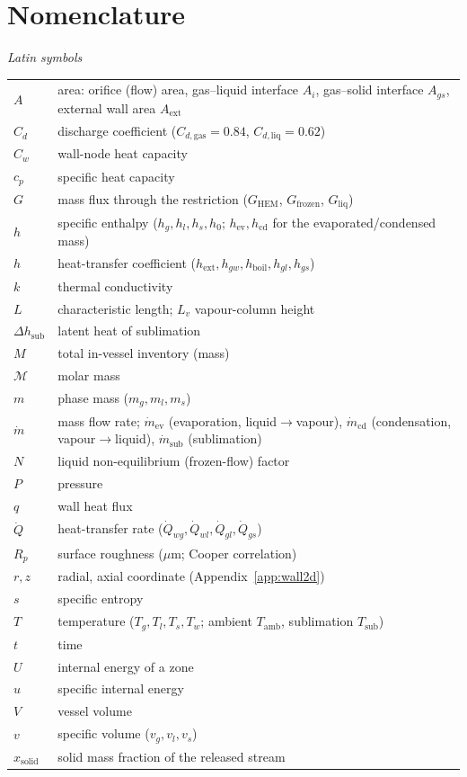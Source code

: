 \documentclass[5p,authoryear]{elsarticle}
\begin{document}
\section*{Nomenclature}
\nolinenumbers
{\small
\noindent\textit{Latin symbols}\\[2pt]
\begin{tabular}{@{}p{}p{}@{}}
$A$ & area: orifice (flow) area, gas--liquid interface $A_i$, gas--solid interface $A_{gs}$, external wall area $A_\text{ext}$ \\
$C_d$ & discharge coefficient ($C_{d,\text{gas}}=0.84$, $C_{d,\text{liq}}=0.62$) \\
$C_w$ & wall-node heat capacity \\
$c_p$ & specific heat capacity \\
$G$ & mass flux through the restriction ($G_\text{HEM}$, $G_\text{frozen}$, $G_\text{liq}$) \\
$h$ & specific enthalpy ($h_g,h_l,h_s,h_0$; $h_\text{ev},h_\text{cd}$ for the evaporated/condensed mass) \\
$h$ & heat-transfer coefficient ($h_\text{ext},h_{gw},h_\text{boil},h_{gl},h_{gs}$) \\
$k$ & thermal conductivity \\
$L$ & characteristic length; $L_v$ vapour-column height \\
$\Delta h_\text{sub}$ & latent heat of sublimation \\
$M$ & total in-vessel inventory (mass) \\
$\mathcal{M}$ & molar mass \\
$m$ & phase mass ($m_g,m_l,m_s$) \\
$\dot m$ & mass flow rate; $\dot m_\text{ev}$ (evaporation, liquid$\to$vapour), $\dot m_\text{cd}$ (condensation, vapour$\to$liquid), $\dot m_\text{sub}$ (sublimation) \\
$N$ & liquid non-equilibrium (frozen-flow) factor \\
$P$ & pressure \\
$q$ & wall heat flux \\
$\dot Q$ & heat-transfer rate ($\dot Q_{wg},\dot Q_{wl},\dot Q_{gl},\dot Q_{gs}$) \\
$R_p$ & surface roughness ($\mu$m; Cooper correlation) \\
$r,z$ & radial, axial coordinate (Appendix~\ref{app:wall2d}) \\
$s$ & specific entropy \\
$T$ & temperature ($T_g,T_l,T_s,T_w$; ambient $T_\text{amb}$, sublimation $T_\text{sub}$) \\
$t$ & time \\
$U$ & internal energy of a zone \\
$u$ & specific internal energy \\
$V$ & vessel volume \\
$v$ & specific volume ($v_g,v_l,v_s$) \\
$x_\text{solid}$ & solid mass fraction of the released stream \\
\end{tabular}

}
\end{document}
